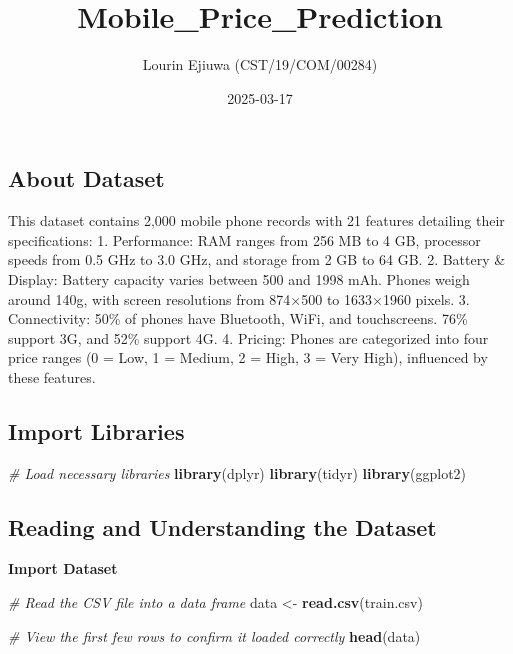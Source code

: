 \documentclass[
]{article}
\title{Mobile\_Price\_Prediction}
\author{Lourin Ejiuwa (CST/19/COM/00284)}
\date{2025-03-17}
\newenvironment{Shaded}{\begin{snugshade}}{\end{snugshade}}
\newcommand{\CommentTok}[1]{\textcolor[rgb]{0.56,0.35,0.01}{\textit{#1}}}
\newcommand{\FunctionTok}[1]{\textcolor[rgb]{0.13,0.29,0.53}{\textbf{#1}}}
\newcommand{\NormalTok}[1]{#1}
\newcommand{\OtherTok}[1]{\textcolor[rgb]{0.56,0.35,0.01}{#1}}
\newcommand{\StringTok}[1]{\textcolor[rgb]{0.31,0.60,0.02}{#1}}
\begin{document}
\maketitle

\subsection{About Dataset}\label{about-dataset}

This dataset contains 2,000 mobile phone records with 21 features
detailing their specifications: 1. Performance: RAM ranges from 256 MB
to 4 GB, processor speeds from 0.5 GHz to 3.0 GHz, and storage from 2 GB
to 64 GB. 2. Battery \& Display: Battery capacity varies between 500 and
1998 mAh. Phones weigh around 140g, with screen resolutions from 874×500
to 1633×1960 pixels. 3. Connectivity: 50\% of phones have Bluetooth,
WiFi, and touchscreens. 76\% support 3G, and 52\% support 4G. 4.
Pricing: Phones are categorized into four price ranges (0 = Low, 1 =
Medium, 2 = High, 3 = Very High), influenced by these features.

\subsection{Import Libraries}\label{import-libraries}

\begin{Shaded}
\begin{Highlighting}[]
\CommentTok{\# Load necessary libraries}
\FunctionTok{library}\NormalTok{(dplyr)}
\FunctionTok{library}\NormalTok{(tidyr)}
\FunctionTok{library}\NormalTok{(ggplot2)}
\end{Highlighting}
\end{Shaded}

\subsection{Reading and Understanding the
Dataset}\label{reading-and-understanding-the-dataset}

\textbf{Import Dataset}

\begin{Shaded}
\begin{Highlighting}[]
\CommentTok{\# Read the CSV file into a data frame}
\NormalTok{data }\OtherTok{\textless{}{-}} \FunctionTok{read.csv}\NormalTok{(}\StringTok{\textquotesingle{}train.csv\textquotesingle{}}\NormalTok{)}

\CommentTok{\# View the first few rows to confirm it loaded correctly}
\FunctionTok{head}\NormalTok{(data)}
\end{Highlighting}
\end{Shaded}
\end{document}
